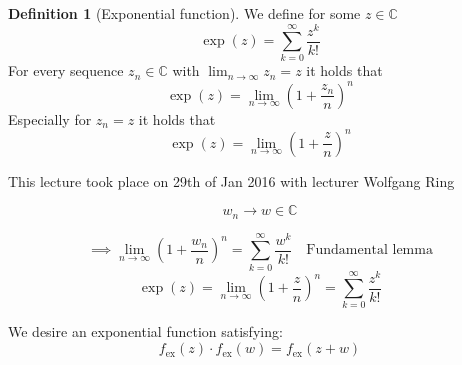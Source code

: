 \documentclass[a4paper,landscape,twocolumn]{article}
\theoremstyle{definition}
\newtheorem{defi}{Definition}
\newcommand\meta[3]{\begin{mdframed}[skipbelow=4pt,skipabove=4pt,innermargin=1pt,innerleftmargin=1pt,innerrightmargin=1pt]\begin{center}\small{\textdownarrow{} This #1 took place on #2 with lecturer #3}\end{center}\end{mdframed}}
\begin{document}
\begin{defi}[Exponential function]
  We define for some $z \in \mathbb C$
  \[ \operatorname{exp}(z) = \sum_{k=0}^\infty \frac{z^k}{k!} \]
  For every sequence $z_n \in \mathbb C$ with $\lim_{n\to\infty} z_n = z$ it holds that
  \[ \operatorname{exp}(z) = \lim_{n\to\infty} \left(1 + \frac{z_n}{n}\right)^n \]
  Especially for $z_n = z$ it holds that
  \[ \operatorname{exp}(z) = \lim_{n\to\infty} \left(1 + \frac{z}{n}\right)^n \]
\end{defi}

\meta{lecture}{29th of Jan 2016}{Wolfgang Ring}

\[ w_n \to w \in \mathbb C \]

\[
  \implies \lim_{n\to\infty} \left(1 + \frac{w_n}{n}\right)^n
  = \sum_{k=0}^\infty \frac{w^k}{k!}
  \quad \text{Fundamental lemma}
\] \[
  \exp(z)
  = \lim_{n\to\infty} \left(1 + \frac zn\right)^n
  = \sum_{k=0}^\infty \frac{z^k}{k!}
\]

We desire an exponential function satisfying:
\[ f_{\text{ex}}(z) \cdot f_{\text{ex}}(w) = f_{\text{ex}}(z + w) \]
\end{document}
